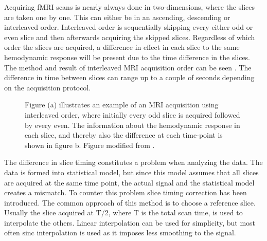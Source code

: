Acquiring fMRI scans is nearly always done in two-dimensions, where the slices are taken one by one. This can either be in an ascending, descending or interleaved order. Interleaved order  is sequentially skipping every either odd or even slice and then afterwards acquiring the skipped slices. Regardless of which order the slices are acquired, a difference in effect in each slice to the same hemodynamic response will be present due to the time difference in the slices. The method and result of interleaved MRI acquisition order can be seen . The difference in time between slices can range up to a couple of seconds depending on the acquisition protocol. 
\begin{figure}[H] 
	\hspace{0.5cm}
	\hspace{0.5cm}
	\caption{Figure (a) illustrates an example of an MRI acquisition using interleaved order, where initially every odd slice is acquired followed by every even. The information about the hemodynamic response in each slice, and thereby also the difference at each time-point is shown in figure b. Figure modified from \cite{Poldrack2011}.}
	\label{fig:back:interleaved}
\end{figure}

The difference in slice timing constitutes a problem when analyzing the data. The data is formed into statistical model, but since this model assumes that all slices are acquired at the same time point, the actual signal and the statistical model creates a mismatch. To counter this problem slice timing correction has been introduced. The common approach of this method is to choose a reference slice. Usually the slice acquired at T/2, where T is the total scan time, is used to interpolate the others. Linear interpolation can be used for simplicity, but most often sinc interpolation is used as it imposes less smoothing to the signal.\cite{Poldrack2011} 

